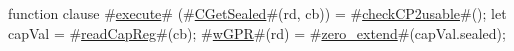 function clause #\hyperref[zexecute]{execute}# (#\hyperref[zCGetSealed]{CGetSealed}#(rd, cb)) =
{
  #\hyperref[zcheckCP2usable]{checkCP2usable}#();
  let capVal = #\hyperref[zreadCapReg]{readCapReg}#(cb);
  #\hyperref[zwGPR]{wGPR}#(rd) = #\hyperref[zzzerozyextend]{zero\_extend}#(capVal.sealed);
}
